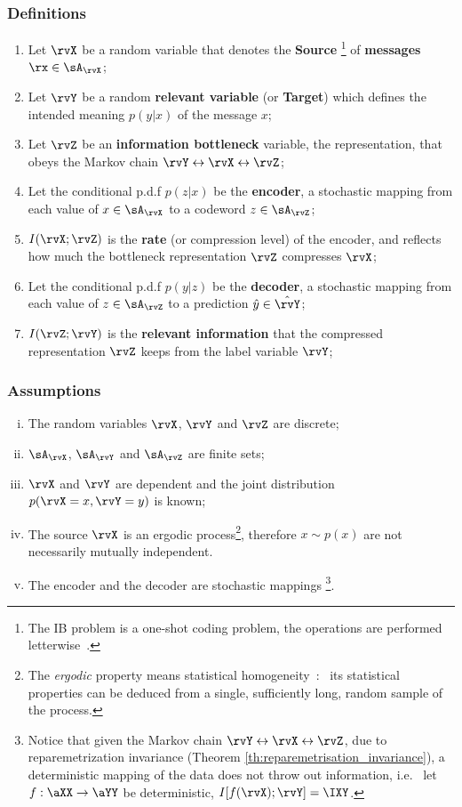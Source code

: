 \subsubsection{Definitions}
\begin{enumerate}
	\item Let $\rvX$ be a random variable that denotes the \textbf{Source} \footnote{The IB problem is a one-shot coding problem, the operations are performed letterwise~\cite{zaidi:2020}.} of \textbf{messages} $\rx \in \sA_{\rvX}$;
	\item Let $\rvY$ be a random \textbf{relevant variable}  (or \textbf{Target}) which defines the intended meaning $p(y|x)$ of the message $x$;
	\item Let $\rvZ$ be an \textbf{information bottleneck} variable, the representation, that obeys the Markov chain $\rvY \leftrightarrow \rvX \leftrightarrow \rvZ$;
	\item Let the conditional p.d.f $p(z|x)$ be the \textbf{encoder}, \ie a stochastic mapping from each value of $x \in \sA_{\rvX}$ to a codeword $z \in \sA_{\rvZ}$;
	\item $I(\rvX ; \rvZ)$ is the \textbf{rate} (or compression level) of the encoder, and reflects how much the bottleneck representation  $\rvZ$ compresses $\rvX$;
	\item Let the conditional p.d.f $p(y|z)$ be the \textbf{decoder}, \ie a stochastic mapping from each value of $z \in \sA_{\rvZ}$ to a prediction $\hat{y} \in \hat{\rvY}$;
	\item $I(\rvZ ; \rvY)$ is the \textbf{relevant information} that the compressed representation $\rvZ$ keeps from the label variable $\rvY$;
\end{enumerate}

  \subsubsection{Assumptions}\label{assumptions}
  \begin{enumerate}
    [i.]
    \item The random variables $\rvX$, $\rvY$ and $\rvZ$ are discrete;
    \item $\sA_{\rvX}$, $\sA_{\rvY}$ and $\sA_{\rvZ}$ are finite sets;
    \item $\rvX$ and $\rvY$ are dependent and the joint distribution $p(\rvX=x, \rvY=y)$ is known;
		\item The source $\rvX$ is an ergodic process\footnote{The \emph{ergodic} property means statistical homogeneity~\cite{shannon:1949}:~ its statistical properties can be deduced from a single, sufficiently long, random sample of the process.}, therefore $x \sim p(x)$ are not necessarily mutually independent.
		\item The encoder and the decoder are stochastic mappings \footnote{Notice that given the Markov chain $\rvY \leftrightarrow \rvX \leftrightarrow \rvZ$, due to reparemetrization invariance (Theorem \ref{th:reparemetrisation_invariance}), a deterministic mapping of the data does not throw out information, i.e. \ let $f:\aXX \to \aYY$ be deterministic, $I[f(\rvX);\rvY]=\IXY$.}.
  \end{enumerate}

